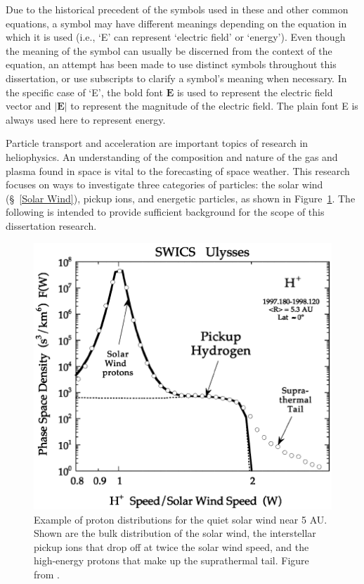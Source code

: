 Due to the historical precedent of the symbols used in these and other common equations, a symbol may have different meanings depending on the equation in which it is used (i.e., `E' can represent `electric field' or `energy'). Even though the meaning of the symbol can usually be discerned from the context of the equation, an attempt has been made to use distinct symbols throughout this dissertation, or use subscripts to clarify a symbol's meaning when necessary. In the specific case of `E', the bold font $\mathbf{E}$ is used to represent the electric field vector and $\left|\mathbf{E}\right|$  to represent the magnitude of the electric field. The plain font E is always used here to represent energy.

Particle transport and acceleration are important topics of research in heliophysics. An understanding of the composition and nature of the gas and plasma found in space is vital to the forecasting of space weather. This research focuses on ways to investigate three categories of particles: the solar wind (\S~\ref{Solar Wind}), pickup ions, and energetic particles, as shown in Figure~\ref{fig:H_Distribution}. The following is intended to provide sufficient background for the scope of this dissertation research.
\begin{figure}
  \centering
  \includegraphics[width=.65\textwidth]{Chap2/H_Distribution}
  \caption[Example of proton distributions for the quiet solar wind near 5 AU.]{Example of proton distributions for the quiet solar wind near 5 AU. Shown are the bulk distribution of the solar wind, the interstellar pickup ions that drop off at twice the solar wind speed, and the high-energy protons that make up the suprathermal tail. Figure from \citet{gloeckler01b}.}
  \label{fig:H_Distribution}
\end{figure}

